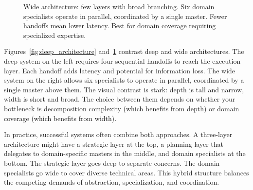 \begin{figure}[t]
\centering
{}
\caption{Wide architecture: few layers with broad branching. Six domain specialists operate in parallel, coordinated by a single master. Fewer handoffs mean lower latency. Best for domain coverage requiring specialized expertise.}
\label{fig:wide_architecture}
\end{figure}

Figures~\ref{fig:deep_architecture} and~\ref{fig:wide_architecture} contrast deep and wide architectures. The deep system on the left requires four sequential handoffs to reach the execution layer. Each handoff adds latency and potential for information loss. The wide system on the right allows six specialists to operate in parallel, coordinated by a single master above them. The visual contrast is stark: depth is tall and narrow, width is short and broad. The choice between them depends on whether your bottleneck is decomposition complexity (which benefits from depth) or domain coverage (which benefits from width).

In practice, successful systems often combine both approaches. A three-layer architecture might have a strategic layer at the top, a planning layer that delegates to domain-specific masters in the middle, and domain specialists at the bottom. The strategic layer goes deep to separate concerns. The domain specialists go wide to cover diverse technical areas. This hybrid structure balances the competing demands of abstraction, specialization, and coordination.
